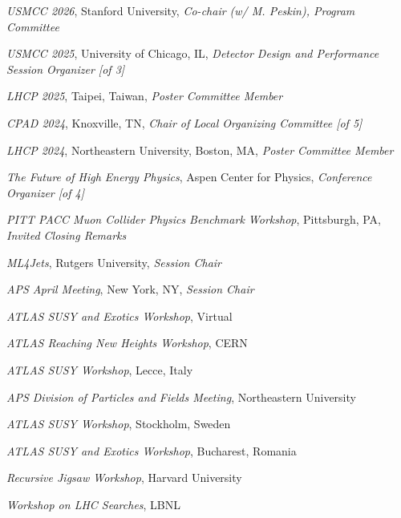 \documentclass[11pt,letterpaper]{article}
\begin{document}
\begin{itemizetighter}

  \item \textit{USMCC 2026}, Stanford University, \emph{Co-chair (w/ M. Peskin), Program Committee}  %
  \item \textit{USMCC 2025}, University of Chicago, IL, \emph{Detector Design and Performance Session Organizer [of 3]}  %
  \item \textit{LHCP 2025}, Taipei, Taiwan, \emph{Poster Committee Member}  %
  \item \textit{CPAD 2024}, Knoxville, TN, \emph{Chair of Local Organizing Committee [of 5]}  %
  \item \textit{LHCP 2024}, Northeastern University, Boston, MA, \emph{Poster Committee Member}  %

  \item \textit{The Future of High Energy Physics}, Aspen Center for Physics, \emph{Conference Organizer [of 4]}  %
  \item \textit{PITT PACC Muon Collider Physics Benchmark Workshop}, Pittsburgh, PA, \emph{Invited Closing Remarks}  %
  \item \textit{ML4Jets}, Rutgers University, \emph{Session Chair}  %
  \item \textit{APS April Meeting}, New York, NY, \emph{Session Chair}  %
  \item \textit{ATLAS SUSY and Exotics Workshop}, Virtual  %
  \item \textit{ATLAS Reaching New Heights Workshop}, CERN  %
  \item \textit{ATLAS SUSY Workshop}, Lecce, Italy  %
  \item \textit{APS Division of Particles and Fields Meeting}, Northeastern University  %
  \item \textit{ATLAS SUSY Workshop}, Stockholm, Sweden  %
  \item \textit{ATLAS SUSY and Exotics Workshop}, Bucharest, Romania  %
  \item \textit{Recursive Jigsaw Workshop}, Harvard University  %
  \item \textit{Workshop on LHC Searches}, LBNL  %

  \end{itemizetighter}
\end{document}

